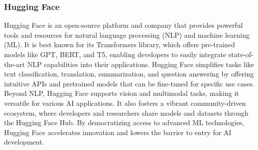 \subsubsection{Hugging Face}
Hugging Face is an open-source platform and company that provides powerful tools and resources for natural language processing (NLP) and machine learning (ML). It is best known for its Transformers library, which offers pre-trained models like GPT, BERT, and T5, enabling developers to easily integrate state-of-the-art NLP capabilities into their applications. Hugging Face simplifies tasks like text classification, translation, summarization, and question answering by offering intuitive APIs and pretrained models that can be fine-tuned for specific use cases. Beyond NLP, Hugging Face supports vision and multimodal tasks, making it versatile for various AI applications. It also fosters a vibrant community-driven ecosystem, where developers and researchers share models and datasets through the Hugging Face Hub. By democratizing access to advanced ML technologies, Hugging Face accelerates innovation and lowers the barrier to entry for AI development. 
